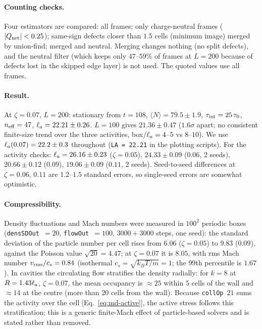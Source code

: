 \paragraph{Counting checks.} Four estimators are compared: all frames; only charge-neutral frames ($|Q_{\rm net}|<0.25$); same-sign defects
closer than $1.5$ cells (minimum image) merged by union-find; merged and neutral. Merging changes nothing (no split defects), and the
neutral filter (which keeps only $47$--$59\%$ of frames at $L=200$ because of defects lost in the skipped edge layer) is not used. The
quoted values use all frames.

\paragraph{Result.} At $\zeta=0.07$, $L=200$: stationary from $t=108$, $\langle N\rangle=79.5\pm1.9$, $\tau_{\rm int}=25\,\tau_0$,
$n_{\rm eff}=47$, $\ell_a=22.21\pm0.26$. $L=100$ gives $21.36\pm0.47$ ($1.6\sigma$ apart; no consistent finite-size trend over the three
activities, box$/\ell_a=4$--$5$ vs $8$--$10$). We use $\ell_a(0.07)=22.2\pm0.3$ throughout (\texttt{LA = 22.21} in the plotting scripts).
For the activity checks: $\ell_a=26.16\pm0.23$ ($\zeta=0.05$), $24.33\pm0.09$ ($0.06$, 2 seeds), $20.66\pm0.12$ ($0.09$), $19.06\pm0.09$ ($0.11$,
2 seeds). Seed-to-seed differences at $\zeta=0.06$, $0.11$ are $1.2$--$1.5$ standard errors, so single-seed errors are somewhat optimistic.

\paragraph{Compressibility.} Density fluctuations and Mach numbers were measured in $100^2$ periodic boxes
(\texttt{densSDOut}~$=20$, \texttt{flowOut}~$=100$, $3000+3000$ steps, one seed): the standard deviation of the particle number per
cell rises from $6.06$ ($\zeta=0.05$) to $9.83$ ($0.09$), against the Poisson value $\sqrt{20}=4.47$; at $\zeta=0.07$ it is $8.05$, with
rms Mach number $v_{\rm rms}/c_s=0.84$ (isothermal $c_s=\sqrt{k_BT/m}=1$; the $99$th percentile is $1.67$). In cavities the circulating
flow stratifies the density radially: for $k=8$ at $R=1.43\ell_a$, $\zeta=0.07$, the mean occupancy is $\approx25$ within $5$ cells of the
wall and $\approx14$ at the centre (more than $20$ cells from the wall). Because \texttt{collOp}~$21$ sums the activity over the cell
[Eq.~\eqref{eq:md-active}], the active stress follows this stratification; this is a generic finite-Mach effect of particle-based
solvers and is stated rather than removed.

